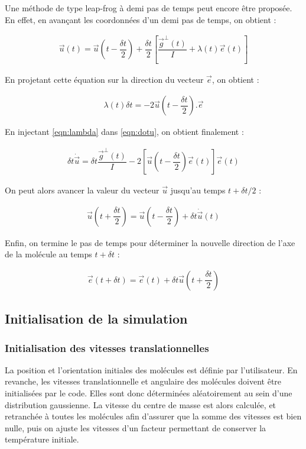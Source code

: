 \documentclass[12pt]{article}
\begin{document}
Une méthode de type leap-frog à demi pas de temps peut encore être proposée. En effet, en avançant les coordonnées d'un demi pas de temps, on obtient :

\begin{eqnarray}
\vec{u}\left(t\right)=\vec{u}\left(t-\dfrac{\delta t}{2}\right)+\dfrac{\delta t}{2}\left[\dfrac{\vec{g}^\perp\left(t\right)}{I}+\lambda\left(t\right)\vec{e}\left(t\right)\right]
\end{eqnarray}

En projetant cette équation sur la direction du vecteur $\vec{e}$, on obtient :

\begin{eqnarray} \label{eqn:lambda}
\lambda\left(t\right) \delta t=-2 \vec{u}\left(t-\dfrac{\delta t}{2}\right) . \vec{e}
\end{eqnarray}

En injectant \ref{eqn:lambda} dans \ref{eqn:dotu}, on obtient finalement :

\begin{eqnarray}
\delta t \dot{\vec{u}}=\delta t \dfrac{\vec{g}^\perp \left(t\right)}{I}-2\left[\vec{u}\left(t-\dfrac{\delta t}{2}\right)\vec{e}\left(t\right)\right] \vec{e}\left(t\right)
\end{eqnarray}

On peut alors avancer la valeur du vecteur $\vec{u}$ jusqu'au temps $t+\delta t/2$ :

\begin{eqnarray}
\vec{u}\left(t+\dfrac{\delta t}{2}\right)=\vec{u}\left(t-\dfrac{\delta t}{2}\right)+\delta t \dot{\vec{u}}\left(t\right)
\end{eqnarray}
 
Enfin, on termine le pas de temps pour déterminer la nouvelle direction de l'axe de la molécule au temps $t+\delta t$ :

\begin{eqnarray}
\vec{e}\left(t+\delta t\right)=\vec{e}\left(t\right)+\delta t\vec{u}\left(t+\dfrac{\delta t}{2}\right)
\end{eqnarray}

	\subsection{Initialisation de la simulation}
	
	\subsubsection{Initialisation des vitesses translationnelles}
La position et l'orientation initiales des molécules est définie par l'utilisateur. En revanche, les vitesses translationnelle et angulaire des molécules doivent être initialisées par le code. Elles sont donc déterminées aléatoirement au sein d'une distribution gaussienne. La vitesse du centre de masse est alors calculée, et retranchée à toutes les molécules afin d'assurer que la somme des vitesses est bien nulle, puis on ajuste les vitesses d'un facteur permettant de conserver la température initiale. 
\\
\end{document}
